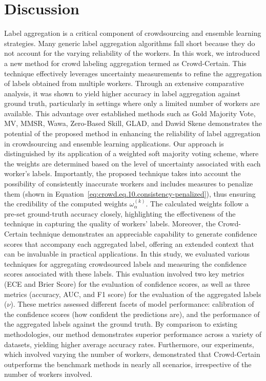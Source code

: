 \documentclass[sn-nature]{bst/sn-jnl}
\begin{document}
\section{Discussion}\label{sec:crowd.discussion}
Label aggregation is a critical component of crowdsourcing and ensemble learning strategies. Many generic label aggregation algorithms fall short because they do not account for the varying reliability of the workers. In this work, we introduced a new method for crowd labeling aggregation termed as Crowd-Certain. This technique effectively leverages uncertainty measurements to refine the aggregation of labels obtained from multiple workers. Through an extensive comparative analysis, it was shown to yield higher accuracy in label aggregation against ground truth, particularly in settings where only a limited number of workers are available. This advantage over established methods such as Gold Majority Vote, MV, MMSR, Wawa, Zero-Based Skill, GLAD, and Dawid Skene demonstrates the potential of the proposed method in enhancing the reliability of label aggregation in crowdsourcing and ensemble learning applications.
Our approach is distinguished by its application of a weighted soft majority voting scheme, where the weights are determined based on the level of uncertainty associated with each worker's labels. Importantly, the proposed technique takes into account the possibility of consistently inaccurate workers and includes measures to penalize them (shown in Equation~\ref{eq:crowd.eq.10.consistency-penalized}), thus ensuring the credibility of the computed weights $\omega_{\alpha}^{(k)}$. The calculated weights follow a pre-set ground-truth accuracy closely, highlighting the effectiveness of the technique in capturing the quality of workers' labels. Moreover, the Crowd-Certain technique demonstrates an appreciable capability to generate confidence scores that accompany each aggregated label, offering an extended context that can be invaluable in practical applications.
In this study, we evaluated various techniques for aggregating crowdsourced labels and measuring the confidence scores associated with these labels. This evaluation involved two key metrics (ECE and Brier Score) for the evaluation of confidence scores, as well as three metrics (accuracy, AUC, and F1 score) for the evaluation of the aggregated labels ($\nu$). These metrics assessed different facets of model performance: calibration of the confidence scores (how confident the predictions are), and the performance of the aggregated labels against the ground truth. By comparison to existing methodologies, our method demonstrates superior performance across a variety of datasets, yielding higher average accuracy rates. Furthermore, our experiments, which involved varying the number of workers, demonstrated that Crowd-Certain outperforms the benchmark methods in nearly all scenarios, irrespective of the number of workers involved.
\end{document}
